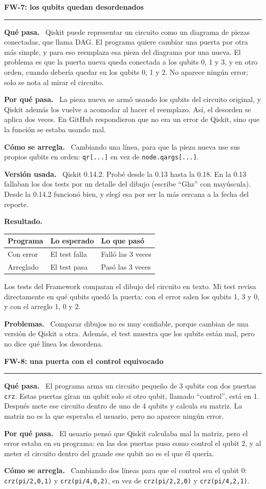 \documentclass[11pt,a4paper]{article}
\newcommand{\paper}[1]{\vspace{1.2em}\par{\large\textbf{#1}}\par\vspace{0.2em}\hrule\vspace{0.4em}}
\newcommand{\parte}[1]{\par\textbf{#1.}\ }
\newcommand{\resultados}[1]{%
\begin{center}
\begin{tabular}{lll}
\toprule
Programa & Lo esperado & Lo que pasó \\
\midrule
Con error & El test falla & Falló las 3 veces \\
Arreglado & El test pasa & Pasó las 3 veces \\
\bottomrule
\end{tabular}
\end{center}}
\begin{document}
\paper{FW-7: los qubits quedan desordenados}

\parte{Qué pasa}
Qiskit puede representar un circuito como un diagrama de piezas conectadas, que llama DAG. El programa quiere cambiar una puerta por otra más simple, y para eso reemplaza esa pieza del diagrama por una nueva. El problema es que la puerta nueva queda conectada a los qubits 0, 1 y 3, y en otro orden, cuando debería quedar en los qubits 0, 1 y 2. No aparece ningún error; solo se nota al mirar el circuito.

\parte{Por qué pasa}
La pieza nueva se armó usando los qubits del circuito original, y Qiskit además los vuelve a acomodar al hacer el reemplazo. Así, el desorden se aplica dos veces. En GitHub respondieron que no era un error de Qiskit, sino que la función se estaba usando mal.

\parte{Cómo se arregla}
Cambiando una línea, para que la pieza nueva use sus propios qubits en orden: \texttt{qr[...]} en vez de \texttt{node.qargs[...]}.

\parte{Versión usada}
Qiskit 0.14.2. Probé desde la 0.13 hasta la 0.18. En la 0.13 fallaban los dos tests por un detalle del dibujo (escribe ``Ghz'' con mayúscula). Desde la 0.14.2 funcionó bien, y elegí esa por ser la más cercana a la fecha del reporte.

\parte{Resultado}
\resultados{7}
Los tests del Framework comparan el dibujo del circuito en texto. Mi test revisa directamente en qué qubits quedó la puerta: con el error salen los qubits 1, 3 y 0, y con el arreglo 1, 0 y 2.

\parte{Problemas}
Comparar dibujos no es muy confiable, porque cambian de una versión de Qiskit a otra. Además, el test muestra que los qubits están mal, pero no dice qué línea los desordena.

\paper{FW-8: una puerta con el control equivocado}

\parte{Qué pasa}
El programa arma un circuito pequeño de 3 qubits con dos puertas \texttt{crz}. Estas puertas giran un qubit solo si otro qubit, llamado ``control'', está en 1. Después mete ese circuito dentro de uno de 4 qubits y calcula su matriz. La matriz no es la que esperaba el usuario, pero no aparece ningún error.

\parte{Por qué pasa}
El usuario pensó que Qiskit calculaba mal la matriz, pero el error estaba en su programa: en las dos puertas puso como control el qubit 2, y al meter el circuito dentro del grande ese qubit no es el que él quería.

\parte{Cómo se arregla}
Cambiando dos líneas para que el control sea el qubit 0: \texttt{crz(pi/2,0,1)} y \texttt{crz(pi/4,0,2)}, en vez de \texttt{crz(pi/2,2,0)} y \texttt{crz(pi/4,2,1)}.
\end{document}
